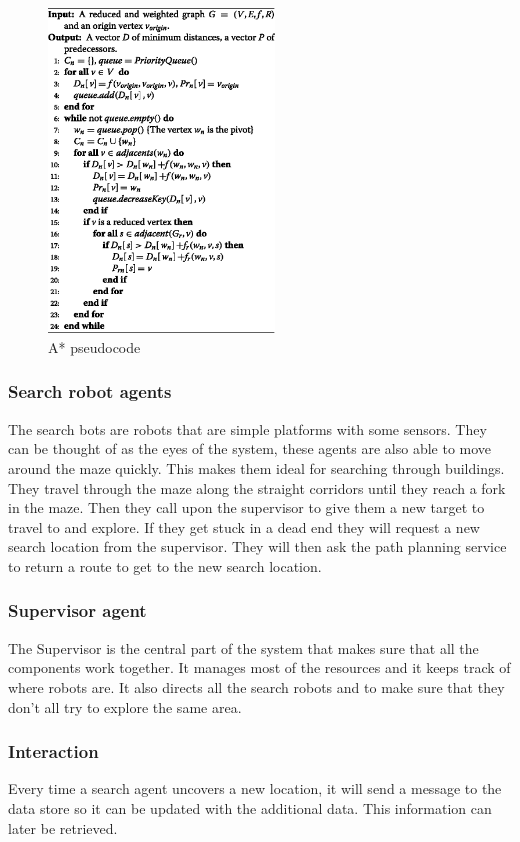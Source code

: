 \begin{figure}[h]
	\centering
		\includegraphics[width=6cm]{Astar}
	\caption{A* pseudocode}
	\label{fig:pseudocode}
\end{figure}

\subsubsection{Search robot agents}
The search bots are robots that are simple platforms with some sensors. They
can be thought of as the eyes of the system, these agents are also able to move
around the maze quickly. This makes them ideal for searching through buildings.
They travel through the maze along the straight corridors until they reach a
fork in the maze. Then they call upon the supervisor to give them a new target
to travel to and explore. If they get stuck in a dead end they will request a
new search location from the supervisor. They will then ask the path planning
service to return a route to get to the new search location.

\subsubsection{Supervisor agent}
The Supervisor is the central part of the system that makes sure that all
the components work together. It manages most of the resources and it keeps
track of where robots are. It also directs all the search robots and to make
sure that they don't all try to explore the same area.

\subsubsection{Interaction}
Every time a search agent uncovers a new location, it will send a message to
the data store so it can be updated with the additional data. This information
can later be retrieved.

